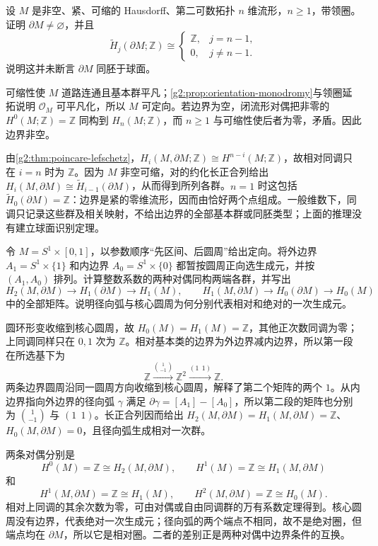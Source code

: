 \begin{exercise}\label{g2:ex:contractible-boundary-homology}
	设 \(M\) 是非空、紧、可缩的 Hausdorff、第二可数拓扑 \(n\) 维流形，\(n\geq1\)，带领圈。证明 \(\partial M\ne\varnothing\)，并且
	\[
		\widetilde H_j(\partial M;\mathbb Z)\cong
		\begin{cases}
			\mathbb Z,&j=n-1,\\
			0,&j\ne n-1.
		\end{cases}
	\]
	说明这并未断言 \(\partial M\) 同胚于球面。
\end{exercise}
\begin{solution}
	可缩性使 \(M\) 道路连通且基本群平凡；\cref{g2:prop:orientation-monodromy}与领圈延拓说明 \(\mathcal O_M\) 可平凡化，所以 \(M\) 可定向。若边界为空，闭流形对偶把非零的 \(H^0(M;\mathbb Z)=\mathbb Z\) 同构到 \(H_n(M;\mathbb Z)\)，而 \(n\geq1\) 与可缩性使后者为零，矛盾。因此边界非空。

	由\cref{g2:thm:poincare-lefschetz}，\(H_i(M,\partial M;\mathbb Z)\cong H^{n-i}(M;\mathbb Z)\)，故相对同调只在 \(i=n\) 时为 \(\mathbb Z\)。因为 \(M\) 非空可缩，对的约化长正合列给出 \(H_i(M,\partial M)\cong\widetilde H_{i-1}(\partial M)\)，从而得到所列各群。\(n=1\) 时这包括 \(\widetilde H_0(\partial M)=\mathbb Z\)：边界是紧的零维流形，因而由恰好两个点组成。一般维数下，同调只记录这些群及相关映射，不给出边界的全部基本群或同胚类型；上面的推理没有建立球面识别定理。
\end{solution}

\begin{exercise}\label{g2:ex:annulus-duality-boundary}
	令 \(M=S^1\times[0,1]\)，以参数顺序“先区间、后圆周”给出定向。将外边界 \(A_1=S^1\times\{1\}\) 和内边界 \(A_0=S^1\times\{0\}\) 都暂按圆周正向选生成元，并按 \((A_1,A_0)\) 排列。计算整数系数的两种对偶同构两端各群，并写出
	\[
		H_2(M,\partial M)\longrightarrow H_1(\partial M)\longrightarrow H_1(M),
		\qquad
		H_1(M,\partial M)\longrightarrow H_0(\partial M)\longrightarrow H_0(M)
	\]
	中的全部矩阵。说明径向弧与核心圆周为何分别代表相对和绝对的一次生成元。
\end{exercise}
\begin{solution}
	圆环形变收缩到核心圆周，故 \(H_0(M)=H_1(M)=\mathbb Z\)，其他正次数同调为零；上同调同样只在 \(0,1\) 次为 \(\mathbb Z\)。相对基本类的边界为外边界减内边界，所以第一段在所选基下为
	\[
		\mathbb Z\xrightarrow{\binom{1}{-1}}\mathbb Z^2
		\xrightarrow{(1\ \ 1)}\mathbb Z.
	\]
	两条边界圆周沿同一圆周方向收缩到核心圆周，解释了第二个矩阵的两个 \(1\)。从内边界指向外边界的径向弧 \(\gamma\) 满足 \(\partial\gamma=[A_1]-[A_0]\)，所以第二段的矩阵也分别为 \(\binom{1}{-1}\) 与 \((1\ \ 1)\)。长正合列因而给出 \(H_2(M,\partial M)=H_1(M,\partial M)=\mathbb Z\)、\(H_0(M,\partial M)=0\)，且径向弧生成相对一次群。

	两条对偶分别是
	\[
		H^0(M)=\mathbb Z\cong H_2(M,\partial M),\qquad
		H^1(M)=\mathbb Z\cong H_1(M,\partial M)
	\]
	和
	\[
		H^1(M,\partial M)=\mathbb Z\cong H_1(M),\qquad
		H^2(M,\partial M)=\mathbb Z\cong H_0(M).
	\]
	相对上同调的其余次数为零，可由对偶或自由同调群的万有系数定理得到。核心圆周没有边界，代表绝对一次生成元；径向弧的两个端点不相同，故不是绝对圈，但端点均在 \(\partial M\)，所以它是相对圈。二者的差别正是两种对偶中边界条件的互换。
\end{solution}

